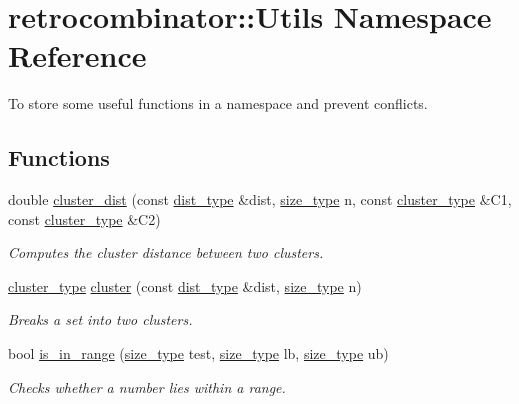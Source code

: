 \hypertarget{namespaceretrocombinator_1_1Utils}{}\section{retrocombinator\+:\+:Utils Namespace Reference}
\label{namespaceretrocombinator_1_1Utils}


To store some useful functions in a namespace and prevent conflicts.  


\subsection*{Functions}
\begin{DoxyCompactItemize}
\item 
double \hyperlink{namespaceretrocombinator_1_1Utils_a75c34419887242476ac8219dfb981459}{cluster\+\_\+dist} (const \hyperlink{constants_8h_aa416b6a3a9e444eae3309a16b8607750}{dist\+\_\+type} \&dist, \hyperlink{constants_8h_a8e1541b50cee66a791df4c437ccbb385}{size\+\_\+type} n, const \hyperlink{constants_8h_a316667a6633d664fe892bd7e0eb0141e}{cluster\+\_\+type} \&C1, const \hyperlink{constants_8h_a316667a6633d664fe892bd7e0eb0141e}{cluster\+\_\+type} \&C2)
\begin{DoxyCompactList}\small\item\em Computes the cluster distance between two clusters. \end{DoxyCompactList}\item 
\hyperlink{constants_8h_a316667a6633d664fe892bd7e0eb0141e}{cluster\+\_\+type} \hyperlink{namespaceretrocombinator_1_1Utils_a03dcc302a7444a0c0897ea1b306e69ef}{cluster} (const \hyperlink{constants_8h_aa416b6a3a9e444eae3309a16b8607750}{dist\+\_\+type} \&dist, \hyperlink{constants_8h_a8e1541b50cee66a791df4c437ccbb385}{size\+\_\+type} n)
\begin{DoxyCompactList}\small\item\em Breaks a set into two clusters. \end{DoxyCompactList}\item 
bool \hyperlink{namespaceretrocombinator_1_1Utils_a984680ddd6d1f7ccee9e0f040ff16183}{is\+\_\+in\+\_\+range} (\hyperlink{constants_8h_a8e1541b50cee66a791df4c437ccbb385}{size\+\_\+type} test, \hyperlink{constants_8h_a8e1541b50cee66a791df4c437ccbb385}{size\+\_\+type} lb, \hyperlink{constants_8h_a8e1541b50cee66a791df4c437ccbb385}{size\+\_\+type} ub)
\begin{DoxyCompactList}\small\item\em Checks whether a number lies within a range. \end{DoxyCompactList}\end{DoxyCompactItemize}


